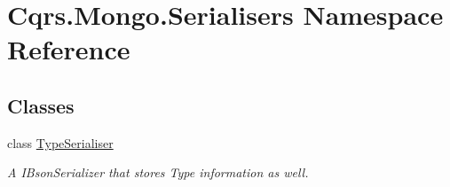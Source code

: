 \hypertarget{namespaceCqrs_1_1Mongo_1_1Serialisers}{}\section{Cqrs.\+Mongo.\+Serialisers Namespace Reference}
\label{namespaceCqrs_1_1Mongo_1_1Serialisers}
\subsection*{Classes}
\begin{DoxyCompactItemize}
\item 
class \hyperlink{classCqrs_1_1Mongo_1_1Serialisers_1_1TypeSerialiser}{Type\+Serialiser}
\begin{DoxyCompactList}\small\item\em A I\+Bson\+Serializer that stores Type information as well. \end{DoxyCompactList}\end{DoxyCompactItemize}
